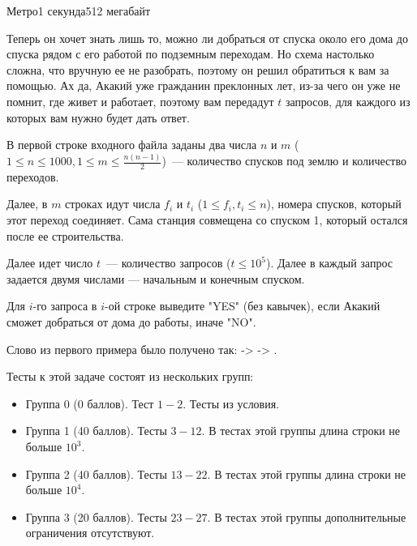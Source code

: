 \begin{problem}{Метро}{}{}{1 секунда}{512 мегабайт}

Теперь он хочет знать лишь то, можно ли добраться от спуска около его дома до спуска рядом с его работой по подземным переходам. Но схема настолько сложна, что вручную ее не разобрать, поэтому он решил обратиться к вам за помощью. Ах да, Акакий уже гражданин преклонных лет, из-за чего он уже не помнит, где живет и работает, поэтому вам передадут $t$ запросов, для каждого из которых вам нужно будет дать ответ. 

\InputFile
В первой строке входного файла заданы два числа $n$ и $m$ ($1 \le n \le 1000, 1 \le m \le \frac{n(n-1)}{2}$)~--- количество спусков под землю и количество переходов.

Далее, в $m$ строках идут числа $f_i$ и $t_i$ ($1 \le f_i, t_i \le n$), номера спусков, который этот переход соединяет. Сама станция совмещена со спуском 1, который остался после ее строительства.

Далее идет число $t$~--- количество запросов ($t \le 10^5$). Далее в каждый запрос задается двумя числами --- начальным и конечным спуском.

\OutputFile
Для $i$-го запроса в $i$-ой строке выведите "YES" (без кавычек), если Акакий сможет добраться от дома до работы, иначе "NO".

\Examples

\begin{example}%
%
\end{example}

\Explanations
Слово из первого примера было получено так:  ->  -> .

\Note
Тесты к этой задаче состоят из нескольких групп:

\begin{itemize}
\setlength{\itemsep}{-1mm}
\item Группа 0 (0 баллов). Тест $1-2$. Тесты из условия.
\item Группа 1 (40 баллов). Тесты $3-12$. В тестах этой группы длина строки не больше $10^3$.
\item Группа 2 (40 баллов). Тесты $13-22$. В тестах этой группы длина строки не больше $10^4$.
\item Группа 3 (20 баллов). Тесты $23-27$. В тестах этой группы дополнительные ограничения отсутствуют.
\end{itemize}


\end{problem}


